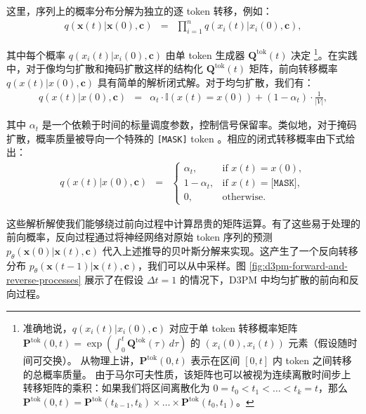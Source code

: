 \documentclass[UTF8,a4paper,zihao=-4,oneside,openany]{ctexbook}
\begin{document}
\noindent 这里，序列上的概率分布分解为独立的逐 token 转移，例如：
\begin{eqnarray}
q(\mathbf{x}(t)|\mathbf{x}(0), \mathbf{c}) & = & \prod_{i=1}^{n} q(x_i(t)|x_i(0), \mathbf{c}),
\end{eqnarray}

\noindent 其中每个概率 $q(x_i(t)|x_i(0), \mathbf{c})$ 由单 token 生成器 $\mathbf{Q}^{\mathrm{tok}}(t)$ 决定
\footnote{准确地说，$q(x_i(t)|x_i(0), \mathbf{c})$ 对应于单 token 转移概率矩阵
$\mathbf{P}^{\mathrm{tok}}(0,t) = \exp\!\left(\int_0^t \mathbf{Q}^{\mathrm{tok}}(\tau)\, d\tau\right)$ 的 $(x_i(0), x_i(t))$ 元素（假设随时间可交换）。
从物理上讲，$\mathbf{P}^{\mathrm{tok}}(0,t)$ 表示在区间 $[0, t]$ 内 token 之间转移的总概率质量。
由于马尔可夫性质，该矩阵也可以被视为连续离散时间步上转移矩阵的乘积：如果我们将区间离散化为 $0=t_0 < t_1 < \dots < t_k=t$，那么
$\mathbf{P}^{\mathrm{tok}}(0,t) = \mathbf{P}^{\mathrm{tok}}(t_{k-1},t_k)\times\dots\times \mathbf{P}^{\mathrm{tok}}(t_0,t_1)$。}。在实践中，对于像均匀扩散和掩码扩散这样的结构化 $\mathbf{Q}^{\mathrm{tok}}(t)$ 矩阵，前向转移概率 $q(x(t) | x(0), \mathbf{c})$ 具有简单的解析闭式解。对于均匀扩散，我们有：
\begin{eqnarray}
q(x(t) | x(0), \mathbf{c}) & = & \alpha_t \cdot \mathbb{I}(x(t) = x(0)) + (1 - \alpha_t) \cdot \frac{1}{|V|},
\end{eqnarray}

\noindent 其中 $\alpha_t$ 是一个依赖于时间的标量调度参数，控制信号保留率。类似地，对于掩码扩散，概率质量被导向一个特殊的 \texttt{[MASK]} token 。相应的闭式转移概率由下式给出：
\begin{eqnarray}
q(x(t) | x(0), \mathbf{c}) & = & \begin{cases} \alpha_t, & \text{if } x(t) = x(0), \\ 1 - \alpha_t, & \text{if } x(t) = \texttt{[MASK]}, \\ 0, & \text{otherwise.} \end{cases}
\end{eqnarray}

这些解析解使我们能够绕过前向过程中计算昂贵的矩阵运算。有了这些易于处理的前向概率，反向过程通过将神经网络对原始 token 序列的预测 $p_\theta(\mathbf{x}(0) | \mathbf{x}(t), \mathbf{c})$ 代入上述推导的贝叶斯分解来实现。这产生了一个反向转移分布 $p_\theta(\mathbf{x}(t - 1) | \mathbf{x}(t), \mathbf{c})$，我们可以从中采样。图 \ref{fig:d3pm-forward-and-reverse-processes} 展示了在假设 $\Delta t = 1$ 的情况下，D3PM 中均匀扩散的前向和反向过程。
\end{document}
